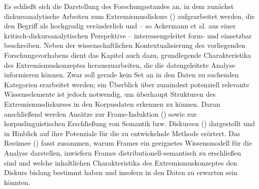 Es schließt sich die Darstellung des Forschungsstandes an, in dem zunächst diskursanalytische Arbeiten zum Extremismusdiskurs () aufgearbeitet werden, die den Begriff als hochgradig veränderlich und -- so Ackermann et al. \autocite*{ackermannMetamorphosenExtremismusbegriffesDiskursanalytische2015} aus einer kritisch-diskursanalytischen Perspektive -- interessengeleitet form- und einsetzbar beschreiben. Neben der wissenschaftlichen Kontextualisierung des vorliegenden Forschungsvorhabens dient das Kapitel auch dazu, grundlegende Charakteristika des Extremismuskonzeptes herauszuarbeiten, die die datengeleitete Analyse informieren können. Zwar soll gerade kein Set an in den Daten zu suchenden Kategorien erarbeitet werden; ein Überblick über zumindest potenziell relevante Wissenselemente ist jedoch notwendig, um überhaupt Strukturen des Extremismusdiskurses in den Korpusdaten erkennen zu können. Daran anschließend werden Ansätze zur Frame-Induktion () sowie zur korpuslinguistischen Erschließung von Semantik bzw. Diskursen () dargestellt und in Hinblick auf ihre Potenziale für die zu entwickelnde Methode erörtert. Das Resümee () fasst zusammen, warum Frames ein geeignetes Wissensmodell für die Analyse darstellen, inwiefern Frames distributionell-semantisch zu erschließen sind und welche inhaltlichen Charakteristika des Extremismuskonzeptes den Diskurs bislang bestimmt haben und insofern in den Daten zu erwarten sein könnten.

